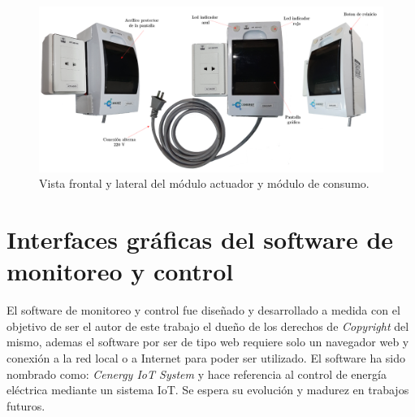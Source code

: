 
\begin{landscape} %
\begin{figure}[htpb]
\centering 
\includegraphics[width=1.8\textwidth]{./Figures/consumo3.png}
\caption{Vista frontal y lateral del módulo actuador y módulo de consumo.}
\label{fig:modConsumo2}
\end{figure}
\end{landscape} %


\section{Interfaces gráficas del software de monitoreo y control}

El software de monitoreo y control fue diseñado y desarrollado a medida con el objetivo de ser el autor de este trabajo el dueño de los derechos de \emph{Copyright} del mismo, ademas el software por ser de tipo web requiere solo un navegador web y conexión a la red local o a Internet para poder ser utilizado. El software ha sido nombrado como: \emph{Cenergy IoT System} y hace referencia al control de energía eléctrica mediante un sistema IoT. Se espera su evolución y madurez en trabajos futuros. 


